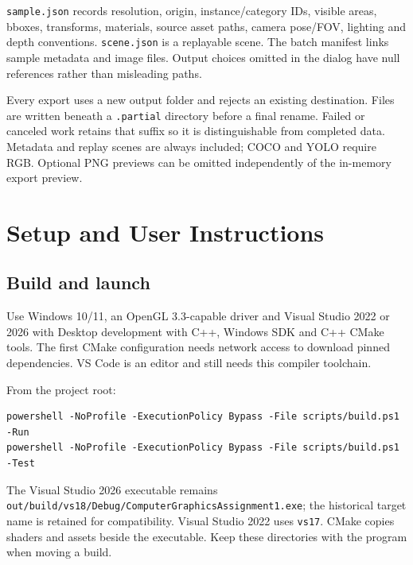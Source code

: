 \documentclass[12pt,a4paper]{article}
\newcommand{\code}[1]{{\small\nolinkurl{#1}}}
\begin{document}
\code{sample.json} records resolution, origin, instance/category IDs, visible areas, bboxes, transforms, materials, source asset paths, camera pose/FOV, lighting and depth conventions. \code{scene.json} is a replayable scene. The batch manifest links sample metadata and image files. Output choices omitted in the dialog have null references rather than misleading paths.

Every export uses a new output folder and rejects an existing destination. Files are written beneath a \code{.partial} directory before a final rename. Failed or canceled work retains that suffix so it is distinguishable from completed data. Metadata and replay scenes are always included; COCO and YOLO require RGB. Optional PNG previews can be omitted independently of the in-memory export preview.

\section{Setup and User Instructions}
\subsection{Build and launch}
Use Windows 10/11, an OpenGL 3.3-capable driver and Visual Studio 2022 or 2026 with Desktop development with C++, Windows SDK and C++ CMake tools. The first CMake configuration needs network access to download pinned dependencies. VS Code is an editor and still needs this compiler toolchain.

From the project root:
\begin{lstlisting}
powershell -NoProfile -ExecutionPolicy Bypass -File scripts/build.ps1 -Run
powershell -NoProfile -ExecutionPolicy Bypass -File scripts/build.ps1 -Test
\end{lstlisting}
The Visual Studio 2026 executable remains \code{out/build/vs18/Debug/ComputerGraphicsAssignment1.exe}; the historical target name is retained for compatibility. Visual Studio 2022 uses \code{vs17}. CMake copies shaders and assets beside the executable. Keep these directories with the program when moving a build.
\end{document}
